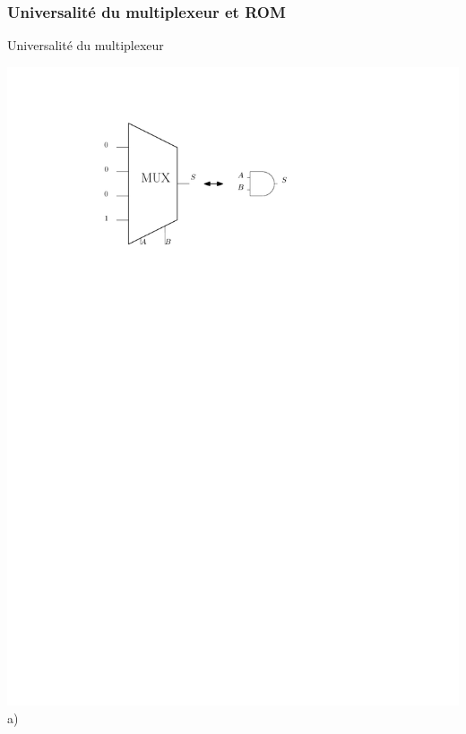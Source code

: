 \documentclass{beamer}
\begin{document}
\begin{frame}
\frametitle{Universalité du multiplexeur et ROM}
\begin{block}{Universalité du multiplexeur}
   \begin{minipage}[c]{.4\linewidth}
\includegraphics[width=\linewidth]{Figs/and_mux.pdf} \\\centering a)
   \end{minipage} \hfill
   \begin{minipage}[c]{0.4\linewidth}

\end{minipage}
\end{block}
\end{frame}
\end{document}
